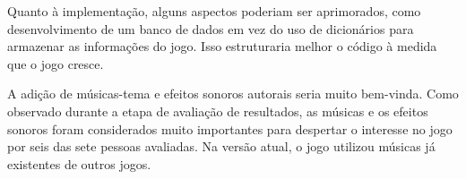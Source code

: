 Quanto à implementação, alguns aspectos poderiam ser aprimorados, como desenvolvimento de um banco de dados em vez  do uso de dicionários para armazenar as informações do jogo. Isso estruturaria melhor o código à medida que o jogo cresce.

A adição de músicas-tema e efeitos sonoros autorais seria muito bem-vinda. Como observado durante a etapa de avaliação de resultados, as músicas e os efeitos sonoros foram considerados muito importantes para despertar o interesse no jogo por seis das sete pessoas avaliadas. Na versão atual, o jogo utilizou músicas já existentes de outros jogos.
